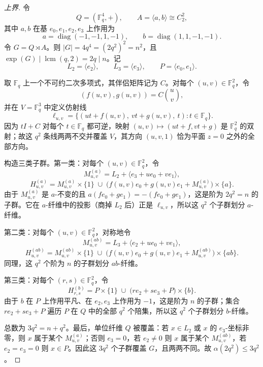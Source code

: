 \documentclass[11pt,a4paper]{article}
\numberwithin{equation}{section}
\theoremstyle{plain}
\theoremstyle{definition}
\theoremstyle{remark}
\newcommand{\F}{\mathbb{F}}
\begin{document}
\begin{proof}[上界]
令
\[
 Q=(\F_q^4,+),\qquad A=\langle a,b\rangle\cong C_2^2,
\]
其中 $a,b$ 在基 $e_0,e_1,e_2,e_3$ 上作用为
\[
 a=\operatorname{diag}(-1,-1,1,-1),\qquad
 b=\operatorname{diag}(1,1,-1,-1).
\]
令 $G=Q\rtimes A$。则 $|G|=4q^4=(2q^2)^2=n^2$，且 $\exp(G)\mid \operatorname{lcm}(q,2)=2q\mid n$。记
\[
 L_2=\langle e_2\rangle,\qquad L_3=\langle e_3\rangle,\qquad
 P=\langle e_0,e_1\rangle.
\]

取 $\F_q$ 上一个不可约二次多项式，其伴侣矩阵记为 $C$。对每个 $(u,v)\in\F_q^2$，令
\[
 (f(u,v),g(u,v))=C\binom{u}{v},
\]
并在 $V=\F_q^3$ 中定义仿射线
\[
 \ell_{u,v}=\{(ut+f(u,v),\ vt+g(u,v),\ t):t\in\F_q\}.
\]
因为 $tI+C$ 对每个 $t\in\F_q$ 都可逆，映射 $(u,v)\mapsto(ut+f,vt+g)$ 是 $\F_q^2$ 的双射；故这 $q^2$ 条线两两不交并覆盖 $V$，其方向 $(u,v,1)$ 恰为平面 $z=0$ 之外的全部方向。

构造三类子群。第一类：对每个 $(u,v)\in\F_q^2$，令
\[
 M^{(a)}_{u,v}=L_2+\langle e_3+u e_0+v e_1\rangle,
\]
\[
 H^{(a)}_{u,v}
=M^{(a)}_{u,v}\times\{1\}
\;\cup\;
\bigl(f(u,v)e_0+g(u,v)e_1+M^{(a)}_{u,v}\bigr)\times\{a\}.
\]
由于 $M^{(a)}_{u,v}$ 是 $a$-不变的且 $a(fe_0+ge_1)=-(fe_0+ge_1)$，这是阶为 $2q^2=n$ 的子群。它在 $a$-纤维中的投影（商掉 $L_2$ 后）正是 $\ell_{u,v}$，所以这 $q^2$ 个子群划分 $a$-纤维。

第二类：对每个 $(u,v)\in\F_q^2$，对称地令
\[
 M^{(ab)}_{u,v}=L_3+\langle e_2+u e_0+v e_1\rangle,
\]
\[
 H^{(ab)}_{u,v}
=M^{(ab)}_{u,v}\times\{1\}
\;\cup\;
\bigl(f(u,v)e_0+g(u,v)e_1+M^{(ab)}_{u,v}\bigr)\times\{ab\}.
\]
同理，这 $q^2$ 个阶为 $n$ 的子群划分 $ab$-纤维。

第三类：对每个 $(r,s)\in\F_q^2$，令
\[
 H^{(b)}_{r,s}
=P\times\{1\}
\;\cup\;
\bigl(r e_2+s e_3+P\bigr)\times\{b\}.
\]
由于 $b$ 在 $P$ 上作用平凡、在 $e_2,e_3$ 上作用为 $-1$，这是阶为 $n$ 的子群；集合 $r e_2+s e_3+P$ 遍历 $P$ 在 $Q$ 中的全部 $q^2$ 个陪集，所以这 $q^2$ 个子群划分 $b$-纤维。

总数为 $3q^2=n+q^2$。最后，单位纤维 $Q$ 被覆盖：若 $x\in L_2$ 或 $x$ 的 $e_3$-坐标非零，则 $x$ 属于某个 $M^{(a)}_{u,v}$；否则 $e_3=0$，若 $e_2\ne0$ 则 $x$ 属于某个 $M^{(ab)}_{u,v}$，若 $e_2=e_3=0$ 则 $x\in P$。因此这 $3q^2$ 个子群覆盖 $G$，且两两不同。故 $\alpha(2q^2)\le3q^2$。
\end{proof}
\end{document}
